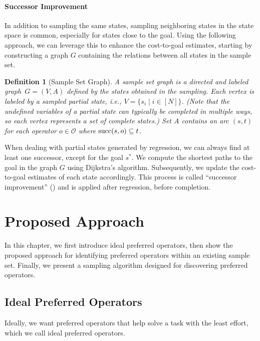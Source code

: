 \documentclass[ppgc,diss,english]{iiufrgs}
\newtheorem{definition}{Definition}
\begin{document}
\subsubsection{Successor Improvement}
\label{sec:sample-sui}
In addition to sampling the same states, sampling neighboring states in the state space is common, especially for states close to the goal. Using the following approach, we can leverage this to enhance the cost-to-goal estimates, starting by constructing a graph $G$ containing the relations between all states in the sample set.

\begin{definition}[Sample Set Graph]\label{def:graph}
A sample set graph is a directed and labeled graph~$G = (V, A)$ defined by the states obtained in the sampling. Each vertex is labeled by a sampled partial state, i.e., $V = \{s_i \mid i \in [N]\}$. (Note that the undefined variables of a partial state can typically be completed in multiple ways, so each vertex represents a set of complete states.) Set $A$ contains an arc $(s,t)$ for each operator $o \in \mathcal{O}$ where $\operatorname{succ}(s,o) \subseteq t$.
\end{definition}

When dealing with partial states generated by regression, we can always find at least one successor, except for the goal $s^{*}$. We compute the shortest paths to the goal in the graph $G$ using Dijkstra's algorithm. Subsequently, we update the cost-to-goal estimates of each state accordingly. This process is called ``successor improvement'' (\sui) and is applied after regression, before completion.


%
%
\chapter{Proposed Approach}
\label{cha:proposed-approach}
In this chapter, we first introduce ideal preferred operators, then show the proposed approach for identifying preferred operators within an existing sample set. Finally, we present a sampling algorithm designed for discovering preferred operators.

\section{Ideal Preferred Operators}
\label{sec:sample-ideal-po}
Ideally, we want preferred operators that help solve a task with the least effort, which we call ideal preferred operators.
\end{document}
